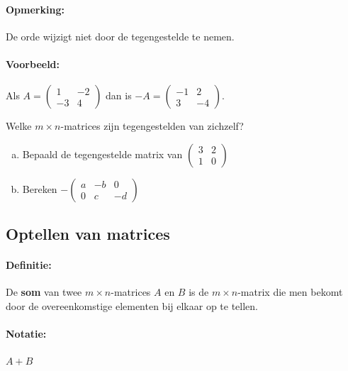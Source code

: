 \documentclass[12pt,twoside]{article}
\begin{document}
\paragraph*{Opmerking:} De orde wijzigt niet door de tegengestelde te nemen.

\paragraph*{Voorbeeld:} Als
$A=\begin{pmatrix}1 & -2\\ -3 & 4\end{pmatrix}$
dan is
$-A=\begin{pmatrix}-1 & 2\\ 3 & -4\end{pmatrix}$.

\begin{oefening}
  Welke $m \times n$-matrices zijn tegengestelden van zichzelf?
\end{oefening}

\begin{oefening}
  \begin{enumerate}[(a)]
  \item Bepaald de tegengestelde matrix van $\begin{pmatrix}3 & 2\\ 1 & 0\end{pmatrix}$
  \item Bereken \qquad $-\begin{pmatrix}a & -b & 0\\ 0 & c & -d\end{pmatrix}$
  \end{enumerate}
\end{oefening}

\subsection{Optellen van matrices}

\paragraph*{Definitie:} De {\bf som} van twee $m \times n$-matrices $A$ en $B$ is de $m \times n$-matrix die men bekomt door de overeenkomstige elementen bij elkaar op te tellen.

\paragraph*{Notatie:} $A + B$
\end{document}
